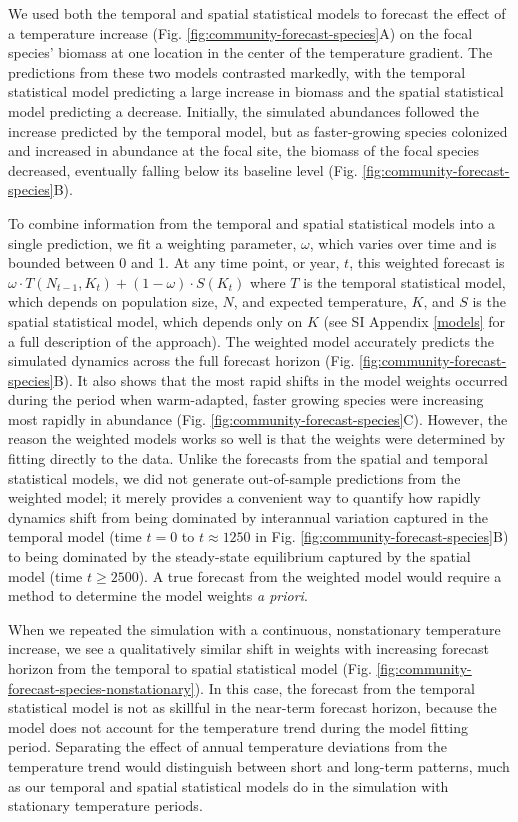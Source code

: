 \documentclass[11pt]{article}
\begin{document}
We used both the temporal and spatial statistical models to forecast the effect of a temperature increase (Fig. \ref{fig:community-forecast-species}A) on the focal species' biomass at one location in the center of the temperature gradient. 
The predictions from these two models contrasted markedly, with the temporal 
statistical model predicting a large increase in biomass and the spatial statistical model predicting a decrease. Initially, the simulated abundances followed the increase predicted by the 
temporal model, but as faster-growing species colonized and increased in abundance at the focal site, the biomass of the focal species decreased, eventually falling below its baseline level (Fig. \ref{fig:community-forecast-species}B). 

To combine information from the temporal and spatial statistical models into a single prediction, we fit a weighting parameter, $\omega$, which varies over time and is bounded between 0 and 1. At any time point, or year, $t$, this weighted forecast is $\omega \cdot T(N_{t-1},K_t) + (1-\omega) \cdot S(K_t) $ where $T$ is the temporal statistical model, which depends on population size, $N$, and expected temperature, $K$, and $S$ is the spatial statistical model, which depends only on $K$ (see SI Appendix \ref{models} for a full description of the approach). The weighted model accurately predicts the simulated dynamics across the full forecast horizon (Fig. \ref{fig:community-forecast-species}B). It also shows that the most rapid shifts in the model weights occurred during the period when warm-adapted, faster growing species were increasing most rapidly in abundance (Fig. \ref{fig:community-forecast-species}C). However, the reason the weighted models works so well is that the weights were determined by fitting directly to the data. Unlike the forecasts from the spatial and temporal statistical models, we did not generate out-of-sample predictions from the weighted model; it merely provides a convenient way to quantify how rapidly dynamics shift from being dominated by interannual variation captured in the temporal model (time $t=0$ to $t \approx 1250$ in Fig. \ref{fig:community-forecast-species}B) to being dominated by the steady-state equilibrium captured by the spatial model (time $t \geq 2500$). A true forecast from the weighted model would require a method to determine the model weights \emph{a priori}. 

When we repeated the simulation with a continuous, nonstationary temperature increase, we see a qualitatively similar shift in weights with increasing forecast horizon from the temporal to spatial statistical model (Fig. \ref{fig:community-forecast-species-nonstationary}). In this case, the forecast from the temporal statistical model is not as skillful in the near-term forecast horizon, because the model does not account for the temperature trend during the model fitting period. Separating the effect of annual temperature deviations from the temperature trend would distinguish between short and long-term patterns, much as our temporal and spatial statistical models do in the simulation with stationary temperature periods. 
\end{document}
